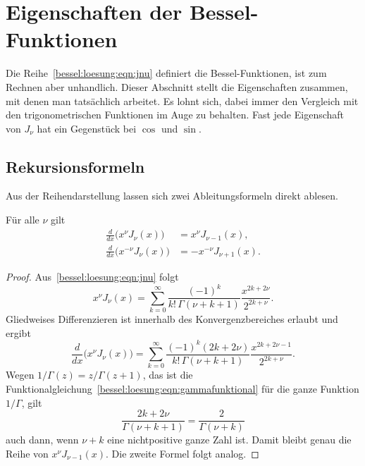 %
%
%
%
\section{Eigenschaften der Bessel-Funktionen
\label{bessel:section:eigenschaften}}
Die Reihe~\eqref{bessel:loesung:eqn:jnu} definiert die Bessel-Funktionen, ist zum Rechnen aber unhandlich.
Dieser Abschnitt stellt die Eigenschaften zusammen, mit denen man tatsächlich arbeitet.
Es lohnt sich, dabei immer den Vergleich mit den trigonometrischen Funktionen im Auge zu behalten.
Fast jede Eigenschaft von $J_\nu$ hat ein Gegenstück bei $\cos$ und $\sin$.

%
%
\subsection{Rekursionsformeln
\label{bessel:eigenschaften:subsection:rekursion}}
Aus der Reihendarstellung lassen sich zwei Ableitungsformeln direkt ablesen.

\begin{satz}
\label{bessel:eigenschaften:satz:ableitung}
Für alle $\nu$ gilt
\begin{align}
\frac{d}{dx}
\bigl( x^{\nu} J_\nu(x) \bigr)
&=
x^{\nu} J_{\nu-1}(x),
\label{bessel:eigenschaften:eqn:ableitung1}
\\
\frac{d}{dx}
\bigl( x^{-\nu} J_\nu(x) \bigr)
&=
-x^{-\nu} J_{\nu+1}(x).
\label{bessel:eigenschaften:eqn:ableitung2}
\end{align}
\end{satz}

\begin{proof}
Aus~\eqref{bessel:loesung:eqn:jnu} folgt
\[
x^\nu J_\nu(x)
=
\sum_{k=0}^\infty
\frac{(-1)^k}{k!\,\Gamma(\nu+k+1)}
\frac{x^{2k+2\nu}}{2^{2k+\nu}}.
\]
Gliedweises Differenzieren ist innerhalb des Konvergenzbereiches erlaubt und ergibt
\[
\frac{d}{dx}
\bigl( x^\nu J_\nu(x) \bigr)
=
\sum_{k=0}^\infty
\frac{(-1)^k (2k+2\nu)}{k!\,\Gamma(\nu+k+1)}
\frac{x^{2k+2\nu-1}}{2^{2k+\nu}}.
\]
Wegen $1/\Gamma(z)=z/\Gamma(z+1)$, das ist die Funktionalgleichung~\eqref{bessel:loesung:eqn:gammafunktional} für die ganze Funktion $1/\Gamma$, gilt
\[
\frac{2k+2\nu}{\Gamma(\nu+k+1)}
=
\frac{2}{\Gamma(\nu+k)}
\]
auch dann, wenn $\nu+k$ eine nichtpositive ganze Zahl ist.
Damit bleibt genau die Reihe von $x^\nu J_{\nu-1}(x)$.
Die zweite Formel folgt analog.
\end{proof}


